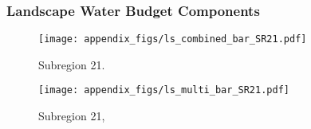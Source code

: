 \subsubsection{Landscape Water Budget Components}
\begin{figure}[ht]
\centerline{\texttt{[image: appendix\_figs/ls\_combined\_bar\_SR21.pdf]}}
\caption{\LSCombinedTextOne Subregion 21.\LSCombinedTextTwo}
\label{fig:LS_budget_SR21}
\end{figure}
\newpage

\begin{landscape}
\begin{figure}[ht]
\centerline{\texttt{[image: appendix\_figs/ls\_multi\_bar\_SR21.pdf]}}
\caption{\LSMultiTextOne Subregion 21,\LSMultiTextTwo}
\label{fig:multi_LS_budget_SR21}
\end{figure}
\newpage
\end{landscape}